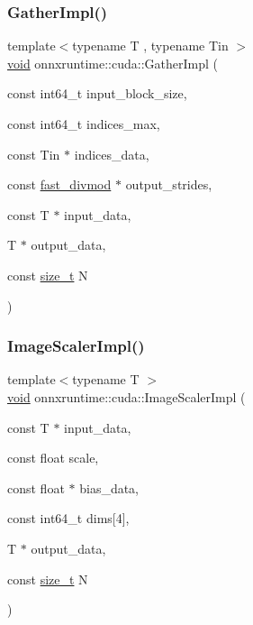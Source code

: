 \mbox{\label{namespaceonnxruntime_1_1cuda_ad9a43f207dedf5127a48035b151b2727}} 
\subsubsection{\texorpdfstring{Gather\+Impl()}{GatherImpl()}}
{\footnotesize\ttfamily template$<$typename T , typename Tin $>$ \\
\mbox{\hyperlink{mlasi_8h_a88f941d423cb2a819b70a1358982b1a6}{void}} onnxruntime\+::cuda\+::\+Gather\+Impl (\begin{DoxyParamCaption}\item[{const int64\+\_\+t}]{input\+\_\+block\+\_\+size,  }\item[{const int64\+\_\+t}]{indices\+\_\+max,  }\item[{const Tin $\ast$}]{indices\+\_\+data,  }\item[{const \mbox{\hyperlink{classonnxruntime_1_1cuda_1_1fast__divmod}{fast\+\_\+divmod}} $\ast$}]{output\+\_\+strides,  }\item[{const T $\ast$}]{input\+\_\+data,  }\item[{T $\ast$}]{output\+\_\+data,  }\item[{const \mbox{\hyperlink{mlasi_8h_a503efbc1c6e50825320ad909366b78ab}{size\+\_\+t}}}]{N }\end{DoxyParamCaption})}

\mbox{\label{namespaceonnxruntime_1_1cuda_a57b6bca9b2d68ad8f4a8eb1e0d8cca75}} 
\subsubsection{\texorpdfstring{Image\+Scaler\+Impl()}{ImageScalerImpl()}}
{\footnotesize\ttfamily template$<$typename T $>$ \\
\mbox{\hyperlink{mlasi_8h_a88f941d423cb2a819b70a1358982b1a6}{void}} onnxruntime\+::cuda\+::\+Image\+Scaler\+Impl (\begin{DoxyParamCaption}\item[{const T $\ast$}]{input\+\_\+data,  }\item[{const float}]{scale,  }\item[{const float $\ast$}]{bias\+\_\+data,  }\item[{const int64\+\_\+t}]{dims\mbox{[}4\mbox{]},  }\item[{T $\ast$}]{output\+\_\+data,  }\item[{const \mbox{\hyperlink{mlasi_8h_a503efbc1c6e50825320ad909366b78ab}{size\+\_\+t}}}]{N }\end{DoxyParamCaption})}

